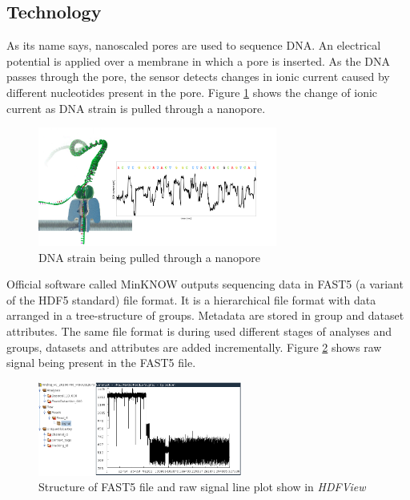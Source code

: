 \documentclass[times, utf8, diplomski, english]{fer}
\begin{document}
\subsection{Technology}
As its name says, nanoscaled pores are used to sequence DNA. An electrical potential is applied over a membrane in which a  pore is inserted. 
As the DNA passes through the pore, the sensor detects changes in ionic current caused by different nucleotides present in the pore. Figure \ref{fg:nanopore} shows the change of ionic current as DNA strain is pulled through a nanopore.

\begin{figure}[!ht]
    \begin{center}
        \includegraphics[width=0.7\textwidth]{nanopore}
        
        \caption[DNA strain being pulled through a nanopore]{DNA strain being pulled through a nanopore \protect\footnotemark}
        \label{fg:nanopore}
    \end{center}
\end{figure}


Official software called MinKNOW outputs sequencing data in FAST5 (a variant of the HDF5 standard) file format. It is a hierarchical file format with data arranged in a tree-structure of groups. Metadata are stored in group and dataset attributes. The same file format is during used different stages of analyses and groups, datasets and attributes are added incrementally. Figure \ref{fg:fast5} shows raw signal being present in the FAST5 file.
\begin{figure}[!ht]
    \begin{center}
        \includegraphics[width=0.6\textwidth]{fast5_sample}
        \caption[Structure of FAST5 file and raw signal plot show in \textit{HDFView}]{Structure of FAST5 file and raw signal line plot show in \textit{HDFView} \protect\footnotemark}
        \label{fg:fast5}
    \end{center}
\end{figure}
\end{document}
